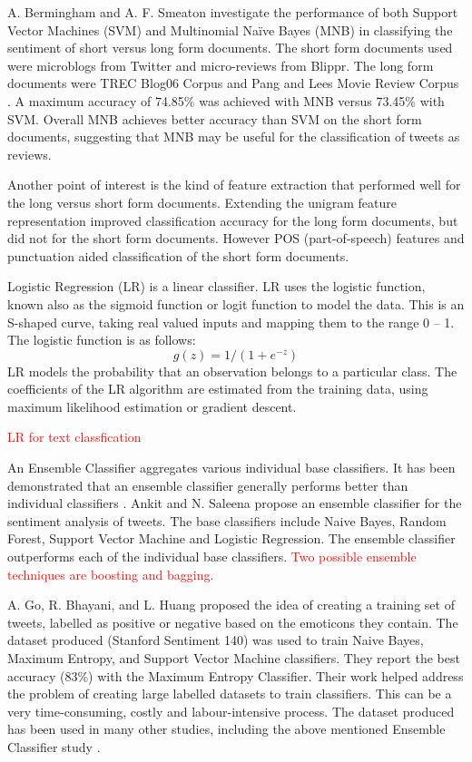 A. Bermingham and A. F. Smeaton \cite{Berm2010} investigate the performance of both Support Vector Machines (SVM) and Multinomial Naïve Bayes (MNB) in classifying the sentiment of short versus long form documents. The short form documents used were microblogs from Twitter and micro-reviews from Blippr. The long form documents were TREC Blog06 Corpus and Pang and Lees Movie Review Corpus \cite{panglee2004}. A maximum accuracy of 74.85\% was achieved with MNB versus 73.45\% with SVM. Overall MNB achieves better accuracy than SVM on the short form documents, suggesting that MNB may be useful for the classification of tweets as reviews.

Another point of interest is the kind of feature extraction that performed well for the long versus short form documents. Extending the unigram feature representation improved classification accuracy for the long form documents, but did not for the short form documents. However POS (part-of-speech) features and punctuation aided classification of the short form documents. 

Logistic Regression (LR) is a linear classifier. LR uses the logistic function, known also as the sigmoid function or logit function to model the data. This is an S-shaped curve, taking real valued inputs and mapping them to the range 0 – 1. The logistic function is as follows: \[g(z)=1/(1+e^{-z})\]
LR models the probability that an observation belongs to a particular class. The coefficients of the LR algorithm are estimated from the training data, using maximum likelihood estimation or gradient descent.

\textcolor{red}{LR for text classfication}

An Ensemble Classifier aggregates various individual base classifiers. It has been demonstrated that an ensemble classifier generally performs better than individual classifiers \cite{Opitz1999}. Ankit and N. Saleena \cite{Ankit2018} propose an ensemble classifier for the sentiment analysis of tweets. The base classifiers include Naive Bayes, Random Forest, Support Vector Machine and Logistic Regression. The ensemble classifier outperforms each of the individual base classifiers.
\textcolor{red}{Two possible ensemble techniques are boosting and bagging.}

A. Go, R. Bhayani, and L. Huang \cite{Go2009} proposed the  idea of creating a training set of tweets, labelled as positive or negative based on the emoticons they contain. The dataset produced (Stanford Sentiment 140) was used to train Naive Bayes, Maximum Entropy, and Support Vector Machine classifiers. They report the best accuracy (83\%) with the Maximum Entropy Classifier. Their work helped address the problem of creating large labelled datasets to train classifiers. This can be a very time-consuming, costly and labour-intensive process. The dataset produced has been used in many other studies, including the above mentioned Ensemble Classifier study \cite{Ankit2018}.

